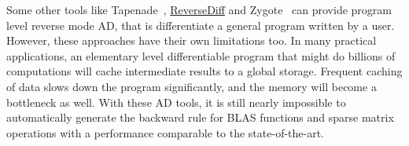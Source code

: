 \documentclass{article}
\newcommand{\<}{\langle}
\renewcommand{\>}{\rangle}
\theoremstyle{definition}\newtheorem{definition}{\textit{Definition}}
\begin{document}
    Some other tools like Tapenade~\cite{Hascoet2013}, \href{https://github.com/JuliaDiff/ReverseDiff.jl}{ReverseDiff} and Zygote~\cite{Innes2018, Innes2019} can provide program level reverse mode AD, that is differentiate a general program written by a user. However, these approaches have their own limitations too. In many practical applications, an elementary level differentiable program that might do billions of computations will cache intermediate results to a global storage. Frequent caching of data slows down the program significantly, and the memory will become a bottleneck as well. With these AD tools, it is still nearly impossible to automatically generate the backward rule for BLAS functions and sparse matrix operations with a performance comparable to the state-of-the-art.%
\end{document}
